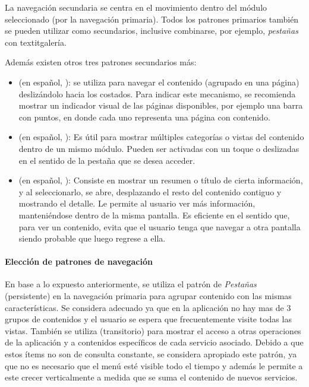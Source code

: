 La navegación secundaria se centra en el movimiento dentro del módulo seleccionado (por la navegación primaria). Todos los patrones primarios también se pueden utilizar como secundarios, inclusive combinarse, por ejemplo, \textit{pestañas} con textit{galería}. 

Además existen otros tres patrones secundarios más\cite{neil2014mobile}:

\begin{itemize}
\item \textbf{} (en español, ): se utiliza para navegar el contenido (agrupado en una página) deslizándolo hacia los costados. Para indicar este mecanismo, se recomienda mostrar un indicador visual de las páginas disponibles, por ejemplo una barra con puntos, en donde cada uno representa una página con contenido.
\item \textbf{} (en español, ): Es útil para mostrar múltiples categorías o vistas del contenido dentro de un mismo módulo. Pueden ser activadas con un toque o deslizadas en el sentido de la pestaña que se desea acceder.
\item \textbf{} (en español, ): Consiste en mostrar un resumen o título de cierta información, y al seleccionarlo, se abre, desplazando el resto del contenido contiguo y mostrando el detalle. Le permite al usuario ver más información, manteniéndose dentro de la misma pantalla. Es eficiente en el sentido que, para ver un contenido, evita que el usuario tenga que navegar a otra pantalla siendo probable que luego regrese a ella.
\end{itemize}

\paragraph{Elección de patrones de navegación}
\label{navegacion_secundaria}

En base a lo expuesto anteriormente, se utiliza el patrón de \textit{Pestañas} (persistente) en la navegación primaria para agrupar contenido con las mismas características. Se considera adecuado ya que en la aplicación no hay mas de 3 grupos de contenidos y el usuario se espera que frecuentemente visite todas las vistas.
También se utiliza  (transitorio) para mostrar el acceso a otras operaciones de la aplicación y a contenidos específicos de cada servicio asociado. Debido a que estos ítems no son de consulta constante, se considera apropiado este patrón, ya que no es necesario que el menú esté visible todo el tiempo y además le permite a este crecer verticalmente a medida que se suma el contenido de nuevos servicios.

